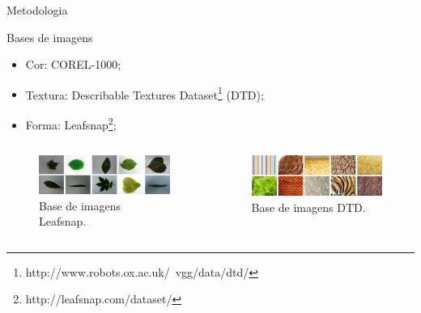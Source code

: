\documentclass{beamer}
\begin{document}
\begin{frame}{Metodologia}
\begin{block}{Bases de imagens}
\justifying
\begin{itemize}
\item Cor: COREL-1000;
\item Textura: Describable Textures Dataset\footnote{http://www.robots.ox.ac.uk/~vgg/data/dtd/} (DTD);
\item Forma: Leafsnap\footnote{http://leafsnap.com/dataset/};
\end{itemize}
\end{block}
\vspace{1em}
\begin{columns}
  \begin{column}{0.5\textwidth}
    \begin{figure}[hbpt]
      \begin{center}
        \includegraphics[width=\columnwidth]{figuras/leafs.png}
      \end{center}
      \caption{Base de imagens Leafsnap.}
    \end{figure}
    \end{column}
  \begin{column}{0.5\textwidth}
    \begin{figure}[hbpt]
      \begin{center}    
        \includegraphics[width=\columnwidth]{figuras/texture.png}
       \end{center}
      \caption{Base de imagens DTD.}
    \end{figure}
  \end{column}
\end{columns}
\end{frame}
\end{document}
